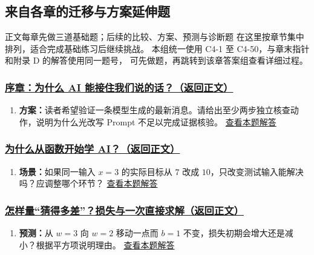 \subsection{来自各章的迁移与方案延伸题}
\label{app:chapter-extensions}
正文每章先做三道基础题；后续的比较、方案、预测与诊断题
在这里按章节集中排列，适合完成基础练习后继续挑战。
本组统一使用 C4-1 至 C4-50，与章末指针和附录 D 的解答使用同一题号，
可先做题，再跳转到该章答案组查看详细过程。

\subsubsection*{\hyperref[check:00-guide]{序章：为什么 AI 能接住我们说的话？（返回正文）}}\begin{enumerate}[label={},leftmargin=4.8em,itemsep=4pt]
\item[\textbf{C4-1.}] \label{exercise:C4-1}\label{extension:00-guide:4}\textbf{方案：}读者希望验证一条模型生成的最新消息。请给出至少两步独立核查动作，说明为什么光改写 Prompt 不足以完成证据核验。 \hyperref[answerpiece:00-guide:4]{查看本题解答}
\end{enumerate}

\subsubsection*{\hyperref[check:00-functions]{为什么从函数开始学 AI？（返回正文）}}\begin{enumerate}[label={},leftmargin=4.8em,itemsep=4pt]
\item[\textbf{C4-2.}] \label{exercise:C4-2}\label{extension:00-functions:4}\textbf{场景：}如果同一输入 $x=3$ 的实际目标从 $7$ 改成 $10$，只改变测试输入能解决吗？应调整哪个环节？ \hyperref[answerpiece:00-functions:4]{查看本题解答}
\end{enumerate}

\subsubsection*{\hyperref[check:16-loss-analytic]{怎样量“猜得多差”？损失与一次直接求解（返回正文）}}\begin{enumerate}[label={},leftmargin=4.8em,itemsep=4pt]
\item[\textbf{C4-3.}] \label{exercise:C4-3}\label{extension:16-loss-analytic:4}\textbf{预测：}从 $w=3$ 向 $w=2$ 移动一点而 $b=1$ 不变，损失初期会增大还是减小？根据平方项说明理由。 \hyperref[answerpiece:16-loss-analytic:4]{查看本题解答}
\end{enumerate}

